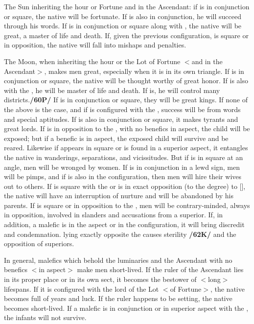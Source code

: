 The Sun inheriting the hour or Fortune and in the Ascendant: if \Jupiter\xspace is in conjunction or square, the native will be fortunate. If \Mercury\xspace is also in conjunction, he will succeed through his words. If \Mars\xspace is in conjunction or square along with \Jupiter, the native will be great, a master of life and death. If, given the previous configuration, \Saturn\xspace is square or in opposition, the native will fall into mishaps and penalties.

The Moon, when inheriting the hour or the Lot of Fortune $<$and in the Ascendant$>$, makes men great, especially when it is in its own triangle. If \Venus\xspace is in conjunction or square, the native will be thought worthy of great honor. If \Mars\xspace is also with the \Moon, he will be master of life and death. If \Saturn\xspace is, he will control many districts.\textbf{/60P/} If \Jupiter\xspace is in conjunction or square, they will be great kings. If none of the above is the case, and if \Mercury\xspace is configured with the \Moon, success will be from words and special aptitudes. If \Mars\xspace is also in conjunction or square, it makes tyrants and great lords. If \Mars\xspace is in opposition to the \Moon, with no benefics in aspect, the child will be exposed; but if a benefic is in aspect, the exposed child will survive and be reared. Likewise if \Mars\xspace appears in square or is found in a superior aspect, it entangles the native in wanderings, separations, and vicissitudes. But if \Venus\xspace is in square at an angle, men will be wronged by women. If \Saturn\xspace is in conjunction in a lewd sign, men will be pimps, and if \Mars\xspace is also in the configuration, then men will hire their wives out to others. If \Saturn\xspace is square with the \Moon\xspace or is in \mned exact opposition (to the degree) to [\Saturn], the native will have an interruption of
nurture and will be abandoned by his parents. If \Mercury\xspace is square or in opposition to the \Moon, men will be contrary-minded, always in opposition, involved in slanders and accusations from a superior. If, in addition, a malefic is in the aspect or in the configuration, it will bring discredit and condemnation. \Jupiter\xspace lying \mned exactly opposite the \Moon\xspace causes sterility \textbf{/62K/} and the opposition of superiors.

\mndl[0.2cm]
In general, malefics which behold the luminaries and the Ascendant with no benefics $<$in aspect$>$ make men short-lived. If the ruler of the Ascendant lies in its proper place or in its own sect, it becomes the bestower of $<$long$>$ lifespans. If it is configured with the lord of the Lot $<$of Fortune$>$, the native becomes full of years and luck. If the ruler happens to be setting, the native becomes short-lived. If a malefic is in conjunction or in superior aspect with the \Moon, the infants will not survive.

\newpage